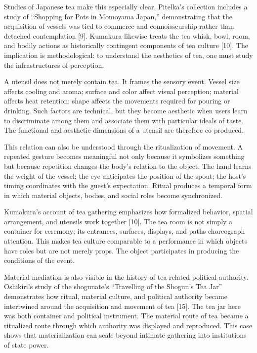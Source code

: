 \documentclass[11pt,a4paper]{article}
\begin{document}
Studies of Japanese tea make this especially clear. Pitelka's collection includes a study of ``Shopping for Pots in Momoyama Japan,'' demonstrating that the acquisition of vessels was tied to commerce and connoisseurship rather than detached contemplation [9]. Kumakura likewise treats the tea whisk, bowl, room, and bodily actions as historically contingent components of tea culture [10]. The implication is methodological: to understand the aesthetics of tea, one must study the infrastructures of perception.

A utensil does not merely contain tea. It frames the sensory event. Vessel size affects cooling and aroma; surface and color affect visual perception; material affects heat retention; shape affects the movements required for pouring or drinking. Such factors are technical, but they become aesthetic when users learn to discriminate among them and associate them with particular ideals of taste. The functional and aesthetic dimensions of a utensil are therefore co-produced.

This relation can also be understood through the ritualization of movement. A repeated gesture becomes meaningful not only because it symbolizes something but because repetition changes the body's relation to the object. The hand learns the weight of the vessel; the eye anticipates the position of the spout; the host's timing coordinates with the guest's expectation. Ritual produces a temporal form in which material objects, bodies, and social roles become synchronized.

Kumakura's account of tea gathering emphasizes how formalized behavior, spatial arrangement, and utensils work together [10]. The tea room is not simply a container for ceremony; its entrances, surfaces, displays, and paths choreograph attention. This makes tea culture comparable to a performance in which objects have roles but are not merely props. The object participates in producing the conditions of the event.

Material mediation is also visible in the history of tea-related political authority. Oshikiri's study of the shogunate's ``Travelling of the Shogun's Tea Jar'' demonstrates how ritual, material culture, and political authority became intertwined around the acquisition and movement of tea [15]. The tea jar here was both container and political instrument. The material route of tea became a ritualized route through which authority was displayed and reproduced. This case shows that materialization can scale beyond intimate gathering into institutions of state power.
\end{document}
